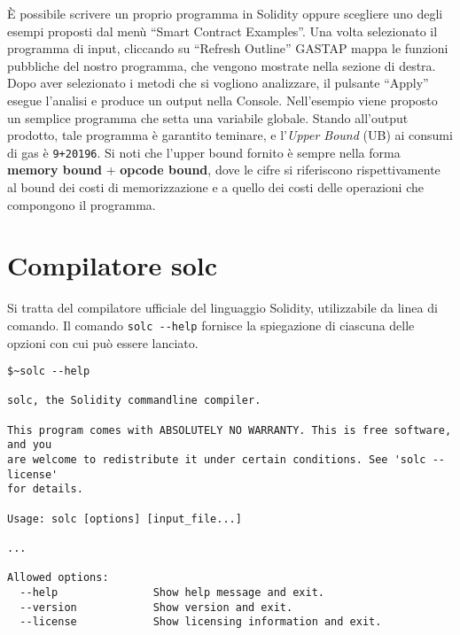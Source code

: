     \`E possibile scrivere un proprio programma in Solidity oppure scegliere uno degli esempi proposti dal menù ``Smart Contract Examples''.\newline
    \indent Una volta selezionato il programma di input, cliccando su ``Refresh Outline'' GASTAP mappa le funzioni pubbliche del nostro programma, che vengono mostrate nella sezione di destra. Dopo aver selezionato i metodi che si vogliono analizzare, il pulsante ``Apply'' esegue l'analisi e produce un output nella Console.\newline
    \indent Nell'esempio viene proposto un semplice programma che setta una variabile globale. Stando all'output prodotto, tale programma è garantito teminare, e l'\textit{Upper Bound} (UB) ai consumi di gas è \verb|9+20196|. Si noti che l'upper bound fornito è sempre nella forma \textbf{memory bound} + \textbf{opcode bound}, dove le cifre si riferiscono rispettivamente al bound dei costi di memorizzazione e a quello dei costi delle operazioni che compongono il programma.\newline

    

    
\section{Compilatore solc}

Si tratta del compilatore ufficiale del linguaggio Solidity, utilizzabile da linea di comando.\newline
\indent Il comando \verb|solc --help| fornisce la spiegazione di ciascuna delle opzioni con cui può essere lanciato.


\begin{lstlisting}
$~solc --help

solc, the Solidity commandline compiler.

This program comes with ABSOLUTELY NO WARRANTY. This is free software, and you
are welcome to redistribute it under certain conditions. See 'solc --license'
for details.

Usage: solc [options] [input_file...]

...

Allowed options:
  --help               Show help message and exit.
  --version            Show version and exit.
  --license            Show licensing information and exit.
    
\end{lstlisting}    
    
